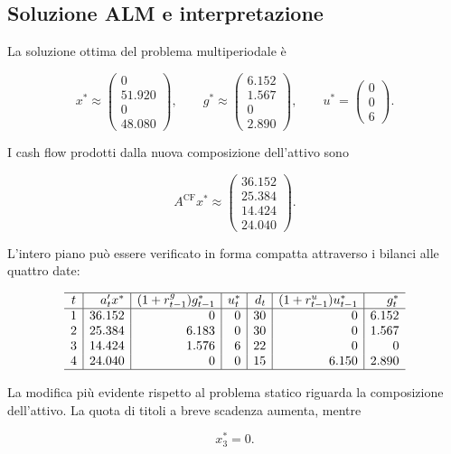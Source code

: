 \subsection{Soluzione ALM e interpretazione}

La soluzione ottima del problema multiperiodale \`e

\[
x^*
\approx
\begin{pmatrix}
0\\
51.920\\
0\\
48.080
\end{pmatrix},
\qquad
g^*
\approx
\begin{pmatrix}
6.152\\
1.567\\
0\\
2.890
\end{pmatrix},
\qquad
u^*
=
\begin{pmatrix}
0\\
0\\
6
\end{pmatrix}.
\]

I cash flow prodotti dalla nuova composizione dell'attivo sono

\[
A^{\mathrm{CF}}x^*
\approx
\begin{pmatrix}
36.152\\
25.384\\
14.424\\
24.040
\end{pmatrix}.
\]

L'intero piano pu\`o essere verificato in forma compatta attraverso i bilanci
alle quattro date:

\[
\begin{array}{c|r|r|r|r|r|r}
\hline
t
&
a_t'x^*
&
(1+r^g_{t-1})g_{t-1}^*
&
u_t^*
&
d_t
&
(1+r^u_{t-1})u_{t-1}^*
&
g_t^*
\\
\hline
1 & 36.152 & 0     & 0 & 30 & 0     & 6.152\\
2 & 25.384 & 6.183 & 0 & 30 & 0     & 1.567\\
3 & 14.424 & 1.576 & 6 & 22 & 0     & 0\\
4 & 24.040 & 0     & 0 & 15 & 6.150 & 2.890\\
\hline
\end{array}
\]

La modifica pi\`u evidente rispetto al problema statico riguarda la
composizione dell'attivo. La quota di titoli a breve scadenza aumenta, mentre

\[
x_3^*=0.
\]

